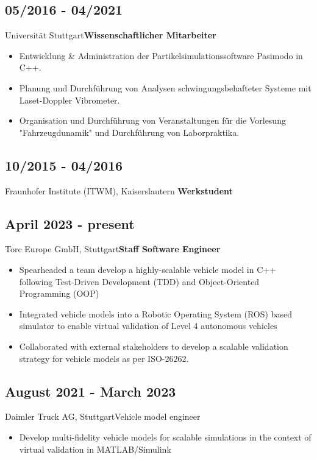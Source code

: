 \documentclass{mycv}
\begin{document}
\begin{paracol}{2}
{        \subsection{05/2016 - 04/2021}{Universit{\"a}t
            Stuttgart}{{\bfseries Wissenschaftlicher Mitarbeiter}}
           \begin{itemize}
               \item Entwicklung \& Administration der Partikelsimulationssoftware
                   Pasimodo in C++.
               \item Planung und Durchf{\"u}hrung von Analysen
                   schwingungsbehafteter Systeme mit Laset-Doppler Vibrometer.
               \item Organisation und Durchf{\"u}hrung von Veranstaltungen f{\"u}r
                   die Vorlesung "Fahrzeugdunamik" und Durchf{\"u}hrung von
                   Laborpraktika.
           \end{itemize}

        \subsection{10/2015 - 04/2016}{Fraunhofer Institute (ITWM), Kaiserslautern}
            {{\bfseries Werkstudent}}\\
}
{
    \subsection{April 2023 - present}{Torc Europe GmbH, Stuttgart}{{\bfseries Staff Software Engineer}}
          \begin{itemize}
            \item Spearheaded a team develop a highly-scalable
                vehicle model in C++ following Test-Driven Development
                (TDD) and Object-Oriented Programming (OOP)
            \item Integrated vehicle models into a Robotic Operating System (ROS)
                based simulator to enable virtual validation of Level 4
                autonomous vehicles
            \item 
                Collaborated with external stakeholders to develop a scalable
                validation strategy for vehicle models as per
                ISO-26262.
          \end{itemize}
    
    \subsection{August 2021 - March 2023}{Daimler Truck AG, Stuttgart}{Vehicle model engineer}
          \begin{itemize}
              \item Develop multi-fidelity vehicle models for scalable simulations in the context of
          virtual validation in MATLAB/Simulink


\end{itemize}}
\end{paracol}
\end{document}
